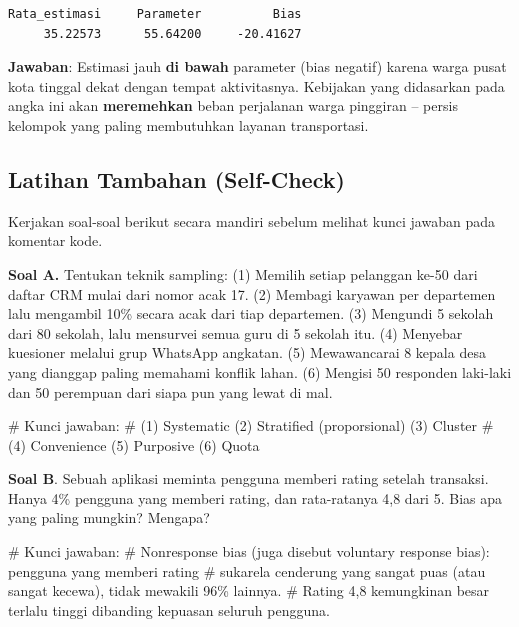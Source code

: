 \documentclass[
  indonesian,
  letterpaper,
]{book}
\newenvironment{Shaded}{\begin{snugshade}}{\end{snugshade}}
\newcommand{\CommentTok}[1]{\textcolor[rgb]{0.37,0.37,0.37}{#1}}
\begin{document}
\begin{verbatim}
Rata_estimasi     Parameter          Bias 
     35.22573      55.64200     -20.41627 
\end{verbatim}

\textbf{Jawaban}: Estimasi jauh \textbf{di bawah} parameter (bias
negatif) karena warga pusat kota tinggal dekat dengan tempat
aktivitasnya. Kebijakan yang didasarkan pada angka ini akan
\textbf{meremehkan} beban perjalanan warga pinggiran -- persis kelompok
yang paling membutuhkan layanan transportasi.

\subsection{Latihan Tambahan
(Self-Check)}\label{latihan-tambahan-self-check-2}

Kerjakan soal-soal berikut secara mandiri sebelum melihat kunci jawaban
pada komentar kode.

\textbf{Soal A.} Tentukan teknik sampling: (1) Memilih setiap pelanggan
ke-50 dari daftar CRM mulai dari nomor acak 17. (2) Membagi karyawan per
departemen lalu mengambil 10\% secara acak dari tiap departemen. (3)
Mengundi 5 sekolah dari 80 sekolah, lalu mensurvei semua guru di 5
sekolah itu. (4) Menyebar kuesioner melalui grup WhatsApp angkatan. (5)
Mewawancarai 8 kepala desa yang dianggap paling memahami konflik lahan.
(6) Mengisi 50 responden laki-laki dan 50 perempuan dari siapa pun yang
lewat di mal.

\begin{Shaded}
\begin{Highlighting}[]
\CommentTok{\# Kunci jawaban:}
\CommentTok{\# (1) Systematic (2) Stratified (proporsional) (3) Cluster}
\CommentTok{\# (4) Convenience (5) Purposive (6) Quota}
\end{Highlighting}
\end{Shaded}

\textbf{Soal B}. Sebuah aplikasi meminta pengguna memberi rating setelah
transaksi. Hanya 4\% pengguna yang memberi rating, dan rata-ratanya 4,8
dari 5. Bias apa yang paling mungkin? Mengapa?

\begin{Shaded}
\begin{Highlighting}[]
\CommentTok{\# Kunci jawaban:}
\CommentTok{\# Nonresponse bias (juga disebut voluntary response bias): pengguna yang memberi rating}
\CommentTok{\# sukarela cenderung yang sangat puas (atau sangat kecewa), tidak mewakili 96\% lainnya.}
\CommentTok{\# Rating 4,8 kemungkinan besar terlalu tinggi dibanding kepuasan seluruh pengguna.}
\end{Highlighting}
\end{Shaded}
\end{document}
